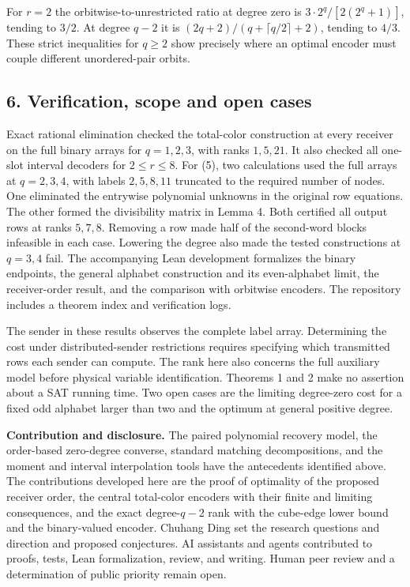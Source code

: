 \documentclass[
  10pt,
]{article}
\begin{document}
For \(r=2\) the orbitwise-to-unrestricted ratio at degree zero is
\(3\cdot2^q/[2(2^q+1)]\), tending to \(3/2\). At degree \(q-2\) it is
\((2q+2)/(q+\lceil q/2\rceil+2)\), tending to \(4/3\). These strict
inequalities for \(q\ge2\) show precisely where an optimal encoder must
couple different unordered-pair orbits.

\subsection{6. Verification, scope and open
cases}\label{verification-scope-and-open-cases}

Exact rational elimination checked the total-color construction at every
receiver on the full binary arrays for \(q=1,2,3\), with ranks
\(1,5,21\). It also checked all one-slot interval decoders for
\(2\le r\le8\). For (5), two calculations used the full arrays at
\(q=2,3,4\), with labels \(2,5,8,11\) truncated to the required number
of nodes. One eliminated the entrywise polynomial unknowns in the
original row equations. The other formed the divisibility matrix in
Lemma 4. Both certified all output rows at ranks \(5,7,8\). Removing a
row made half of the second-word blocks infeasible in each case.
Lowering the degree also made the tested constructions at \(q=3,4\)
fail. The accompanying Lean development formalizes the binary endpoints,
the general alphabet construction and its even-alphabet limit, the
receiver-order result, and the comparison with orbitwise encoders.
The repository includes a theorem index and verification logs.

The sender in these results observes the complete label array.
Determining the cost under distributed-sender restrictions requires
specifying which transmitted rows each sender can compute. The rank here
also concerns the full auxiliary model before physical variable
identification. Theorems 1 and 2 make no assertion about a SAT running
time. Two open cases are the limiting degree-zero cost for a fixed odd
alphabet larger than two and the optimum at general positive degree.

\textbf{Contribution and disclosure.} The paired polynomial recovery
model, the order-based zero-degree converse, standard matching
decompositions, and the moment and interval interpolation tools have the
antecedents identified above. The contributions developed here are the
proof of optimality of the proposed receiver order, the central
total-color encoders with their finite and limiting consequences, and
the exact degree-\(q-2\) rank with the cube-edge lower bound and the
binary-valued encoder. Chuhang Ding set the research questions and direction and proposed conjectures. AI assistants and agents contributed to proofs, tests, Lean formalization, review, and writing. Human peer review and a
determination of public priority remain open.
\end{document}

